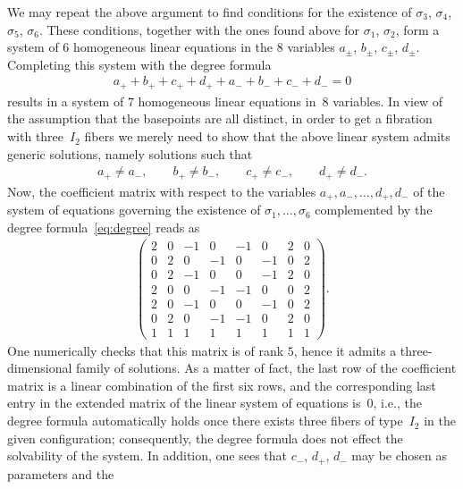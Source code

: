 \documentclass[pdftex]{sigma}
\numberwithin{equation}{section}
\begin{document}
\begin{Example}
We may repeat the above argument
to find conditions for the existence of $\sigma_3$, $\sigma_4$, $\sigma_5$, $\sigma_6$. These conditions, together with the ones found above for $\sigma_1$, $\sigma_2$, form a system of $6$ homogeneous linear equations in the $8$ variables $a_{\pm}$, $b_{\pm}$, $c_{\pm}$, $d_{\pm}$. Completing this system with the degree formula
\begin{gather}\label{eq:degree}
 a_+ + b_+ + c_+ + d_+ + a_- + b_- + c_- + d_- = 0
\end{gather}
results in a system of $7$ homogeneous linear equations in~$8$ variables. In view of the assumption that the basepoints are all distinct, in order to get a fibration with three~$I_2$ fibers we merely need to show that the above linear system admits generic solutions, namely solutions such that
\begin{gather}\label{eq:generic}
 a_+ \neq a_-, \qquad b_+ \neq b_-, \qquad c_+ \neq c_-, \qquad d_+ \neq d_-.
\end{gather}
Now,  the coefficient matrix with respect to the variables $a_+, a_-, \ldots, d_+, d_-$ of the system of equations governing the existence of
$\sigma_1, \ldots , \sigma_6$ complemented by the degree formula~\eqref{eq:degree} reads as
\begin{gather*}
 \begin{pmatrix}
 2 & 0 & -1 & 0 & -1 & 0 & 2 & 0 \\
 0 & 2 & 0 & -1 & 0 & -1 & 0 & 2 \\
 0 & 2 & -1 & 0 & 0 & -1 & 2 & 0 \\
 2 & 0 & 0 & -1 & -1 & 0 & 0 & 2 \\
 2 & 0 & -1 & 0 & 0 & -1 & 0 & 2\\
 0 & 2 & 0 & -1 & -1 & 0 & 2 & 0\\
 1 & 1 & 1 & 1 & 1 & 1 & 1 & 1
 \end{pmatrix}.
\end{gather*}
One numerically checks that this matrix is of rank $5$, hence it
 admits a three-dimensional family of solutions. As a matter of
 fact, the last row of the coefficient matrix is a linear combination
 of the first six rows, and the corresponding last entry in the
 extended matrix of the linear system of equations is~$0$, i.e., the
 degree formula automatically holds once there exists three fibers of
 type~$I_2$ in the given configuration; consequently, the degree
 formula does not effect the solvability of the system. In addition,
 one sees that $c_-$, $d_+$, $d_-$ may be chosen as parameters and the

\end{Example}
\end{document}
